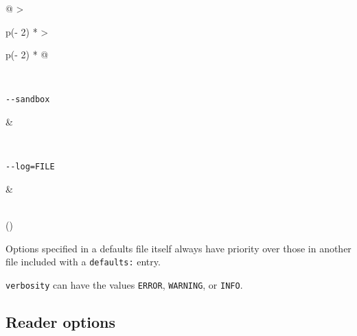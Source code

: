 \begin{longtable}[]{@{}
  >{\raggedright\arraybackslash}p{(\columnwidth - 2\tabcolsep) * }
  >{\raggedright\arraybackslash}p{(\columnwidth - 2\tabcolsep) * }@{}}
\begin{minipage}[t]{\linewidth}
\begin{Shaded}
\begin{Highlighting}[]
\KeywordTok{:}\AttributeTok{ }
\end{Highlighting}
\end{Shaded}
\end{minipage} \\
\begin{minipage}[t]{\linewidth}\raggedright
\begin{verbatim}
--sandbox
\end{verbatim}
\end{minipage} & \begin{minipage}[t]{\linewidth}\raggedright
\begin{Shaded}
\begin{Highlighting}[]
\KeywordTok{:}\AttributeTok{ }
\end{Highlighting}
\end{Shaded}
\end{minipage} \\
\begin{minipage}[t]{\linewidth}\raggedright
\begin{verbatim}
--log=FILE
\end{verbatim}
\end{minipage} & \begin{minipage}[t]{\linewidth}\raggedright
\begin{Shaded}
\begin{Highlighting}[]
\KeywordTok{:}
\end{Highlighting}
\end{Shaded}
\end{minipage} \\
\bottomrule()
\end{longtable}

Options specified in a defaults file itself always have priority over
those in another file included with a \texttt{defaults:} entry.

\texttt{verbosity} can have the values \texttt{ERROR}, \texttt{WARNING},
or \texttt{INFO}.

\hypertarget{reader-options-1}{%
\subsection{Reader options}\label{reader-options-1}}

